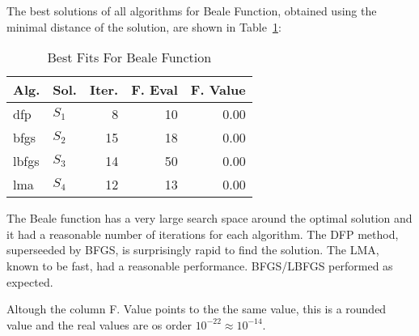 The best solutions of all algorithms for Beale Function, obtained using the minimal
distance of the solution, are shown in Table~\ref{solutions:beale}:

\begin{table}[H]
\centering
\caption{Best Fits For Beale Function}
\label{solutions:beale}
\begin{tabular}{llrrr}
\toprule
 Alg. &    Sol. &  Iter. &  F. Eval &  F. Value \\
\midrule
  dfp & $S_{1}$ &      8 &       10 &      0.00 \\
 bfgs & $S_{2}$ &     15 &       18 &      0.00 \\
lbfgs & $S_{3}$ &     14 &       50 &      0.00 \\
  lma & $S_{4}$ &     12 &       13 &      0.00 \\
\bottomrule
\end{tabular}
\end{table}

The Beale function has a very large search space around the optimal solution and
it had a reasonable number of iterations for each algorithm. The DFP method, superseeded by BFGS,
is surprisingly rapid to find the solution. The LMA, known to be fast, had a reasonable performance.
BFGS/LBFGS performed as expected.

Altough the column F. Value points to the the same value, this is a rounded value
and the real values are os order $10^{-22} \approx 10^{-14}$.

